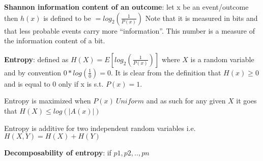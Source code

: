 \textbf{Shannon information content of an outcome}: let x be an event/outcome then $h(x)$ is defined to be 
$= log _2(\frac{1}{ P(x)})$
Note that it is measured in bits and that less probable events carry more “information”.
This number is a measure of the information content of a bit. 

\textbf{Entropy}: defined as $H(X) =  E[log _2(\frac{1}{ P(x)})]$  where $X$ is a random variable and by convention $0*log(\frac{1}{0}) = 0$. 
It is clear from the definition that $H(x)\geq 0$ and is equal to 0 only if x is s.t. $P(x)=1$. 

Entropy is maximized when $P(x)~Uniform$ and as such for any given $X$ it goes that $H(X) \leq log(|A(x)|)$

Entropy is additive for two independent random variables i.e. $H(X,Y) = H(X) + H(Y)$

\textbf{Decomposability of entropy}:  if ${p1,p2,..,pn}$


